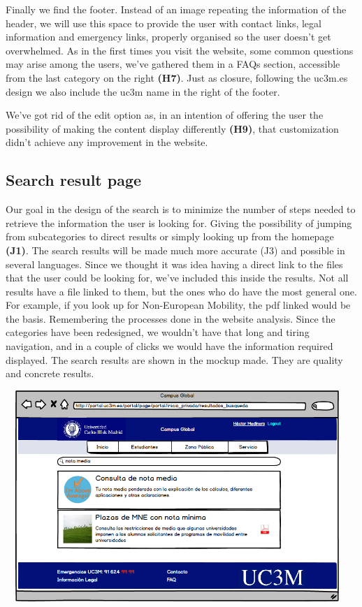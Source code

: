 \documentclass{article}
\begin{document}
Finally we find the footer. Instead of an image repeating the information of the header, we will use this space to provide the user with contact links, legal information and emergency links, properly organised so the user doesn’t get overwhelmed. As in the first times you visit the website, some common questions may arise among the users, we’ve gathered them in a FAQs section, accessible from the last category on the right \textbf{(H7)}. Just as closure, following the uc3m.es design we also include the uc3m name in the right of the footer.

We’ve got rid of the edit option as, in an intention of offering the user the possibility of making the content display differently \textbf{(H9)}, that customization didn’t achieve any improvement in the website.


\subsection{Search result page}
Our goal in the design of the search is to minimize the number of steps needed to retrieve the information the user is looking for. Giving the possibility of jumping from subcategories to direct results or simply looking up from the homepage \textbf{(J1)}. The search results will be made much more accurate (J3) and possible in several languages. Since we thought it was idea having a direct link to the files that the user could be looking for, we’ve included this inside the results. Not all results have a file linked to them, but the ones who do have the most general one. For example, if you look up for Non-European Mobility, the pdf linked would be the basis.
Remembering the processes done in the website analysis. Since the categories have been redesigned, we wouldn’t have that long and tiring navigation, and in a couple of clicks we would have the information required displayed. The search results are shown in the mockup made. They are quality and concrete results.

\begin{center}
\includegraphics[width=13cm, height=8cm, keepaspectratio]{mockup_results}
\end{center}
\end{document}
